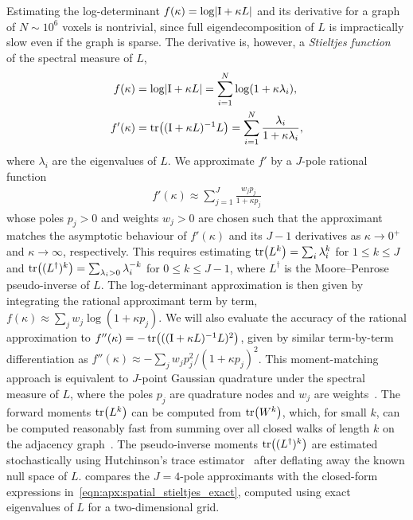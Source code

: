 Estimating the log-determinant $f(\kappa) = \log\lvert \mathrm{I} + \kappa L \rvert$ and its derivative for a graph of $N \sim 10^6$ voxels is nontrivial, since full eigendecomposition of $L$ is impractically slow even if the graph is sparse.
The derivative is, however, a \textit{Stieltjes function}~\citep{stieltjes_recherches_1894} of the spectral measure of $L$,
\begin{align}\label{eqn:apx:spatial_stieltjes_exact}
    f(\kappa)  & = \log\lvert \Id + \kappa L \rvert = \sum_{i = 1}^N \log(1 + \kappa \lambda_i),                   \\
    f'(\kappa) & = \Tr{(\Id + \kappa L)^{-1} L} = \sum_{i = 1}^N \frac{\lambda_i}{1 + \kappa \lambda_i}, \nonumber
\end{align}
where $\lambda_i$ are the eigenvalues of $L$.
We approximate $f'$ by a $J$-pole rational function~\citep{golub_matrices_2009}
\begin{align}\label{eqn:apx:spatial_stieltjes_approx}
    f'(\kappa) \approx \sum_{j=1}^{J} \frac{w_j p_j}{1 + \kappa p_j}
\end{align}
whose poles $p_j > 0$ and weights $w_j > 0$ are chosen such that the approximant matches the asymptotic behaviour of $f'(\kappa)$ and its $J-1$ derivatives as $\kappa \to 0^+$ and $\kappa \to \infty$, respectively.
This requires estimating $\Tr{L^k} = \sum_i \lambda_i^k$ for $1 \le k \le J$ and $\Tr{(L^\dagger)^{k}} = \sum_{\lambda_i>0} \lambda_i^{-k}$ for $0 \le k \le J-1$, where $L^\dagger$ is the Moore--Penrose pseudo-inverse of $L$.
The log-determinant approximation is then given by integrating the rational approximant term by term, $f(\kappa) \approx \sum_j w_j \log(1 + \kappa p_j)$.
We will also evaluate the accuracy of the rational approximation to $f''(\kappa) = -\Tr{((\Id + \kappa L)^{-1}L)^2}$, given by similar term-by-term differentiation as $f''(\kappa) \approx -\sum_j w_j p_j^2/(1+\kappa p_j)^2$.
This moment-matching approach is equivalent to $J$-point Gaussian quadrature under the spectral measure of $L$, where the poles $p_j$ are quadrature nodes and $w_j$ are weights~\citep{golub_matrices_2009}.
The forward moments $\Tr{L^k}$ can be computed from $\Tr{W^k}$, which, for small $k$, can be computed reasonably fast from summing over all closed walks of length $k$ on the adjacency graph~\citep{cvetkovic_spectra_1980}.
The pseudo-inverse moments $\Tr{(L^\dagger)^{k}}$ are estimated stochastically using Hutchinson's trace estimator~\citep{hutchinson_stochastic_1989} after deflating away the known null space of $L$.
 compares the $J=4$-pole approximants with the closed-form expressions in~\cref{eqn:apx:spatial_stieltjes_exact}, computed using exact eigenvalues of $L$ for a two-dimensional grid.

